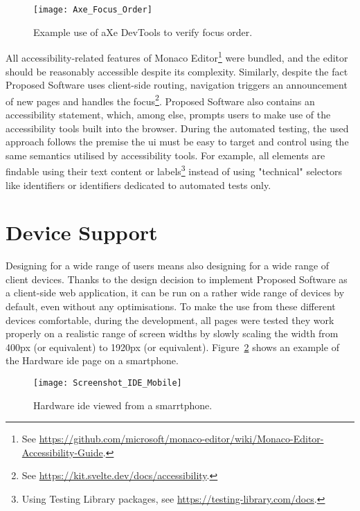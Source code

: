 \begin{figure}[H]
    \centering
    \texttt{[image: Axe\_Focus\_Order]}
    \caption{Example use of aXe DevTools to verify focus order.}
    \label{fig:design-axe-focus}
\end{figure}

All accessibility-related features of Monaco Editor\footnote{See \url{https://github.com/microsoft/monaco-editor/wiki/Monaco-Editor-Accessibility-Guide}.} were bundled, and the editor should be reasonably accessible despite its complexity.
Similarly, despite the fact Proposed Software uses client-side routing, navigation triggers an announcement of new pages and handles the focus\footnote{See \url{https://kit.svelte.dev/docs/accessibility}.}.
Proposed Software also contains an accessibility statement, which, among else, prompts users to make use of the accessibility tools built into the browser.
During the automated testing, the used approach follows the premise the \gls{ui} must be easy to target and control using the same semantics utilised by accessibility tools.
For example, all elements are findable using their text content or labels\footnote{Using Testing Library packages, see \url{https://testing-library.com/docs}.} instead of using "technical" selectors like identifiers or identifiers dedicated to automated tests only.

\section{Device Support}

Designing for a wide range of users means also designing for a wide range of client devices.
Thanks to the design decision to implement Proposed Software as a client-side web application, it can be run on a rather wide range of devices by default, even without any optimisations.
To make the use from these different devices comfortable, during the development, all pages were tested they work properly on a realistic range of screen widths by slowly scaling the width from 400px (or equivalent) to 1920px (or equivalent).
Figure~\ref{fig:design-screenshot-ide-mobile} shows an example of the Hardware \gls{ide} page on a smartphone.

\begin{figure}[H]
    \centering
    \texttt{[image: Screenshot\_IDE\_Mobile]}
    \caption{Hardware \gls{ide} viewed from a smarrtphone.}
    \label{fig:design-screenshot-ide-mobile}
\end{figure}

